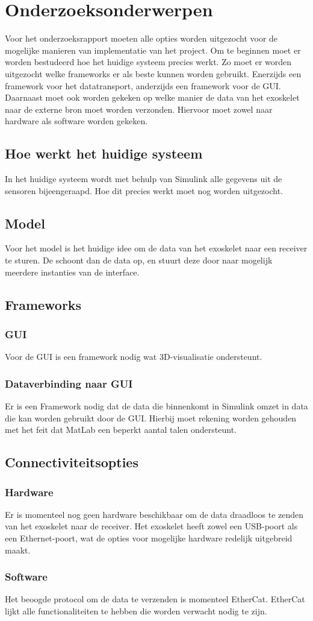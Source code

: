 \section{Onderzoeksonderwerpen}
Voor het onderzoeksrapport moeten alle opties worden uitgezocht voor de mogelijke manieren van implementatie van het project. Om	 te beginnen moet er worden bestudeerd hoe het huidige systeem precies werkt. Zo moet er worden uitgezocht welke frameworks er als beste kunnen worden gebruikt. Enerzijds een framework voor het datatransport, anderzijds een framework voor de GUI. Daarnaast moet ook worden gekeken op welke manier de data van het exoskelet naar de externe bron moet worden verzonden. Hiervoor moet zowel naar hardware als software worden gekeken.
\subsection{Hoe werkt het huidige systeem}
In het huidige systeem wordt met behulp van Simulink alle gegevens uit de sensoren bijeengeraapd. Hoe dit precies werkt moet nog worden uitgezocht. 
\subsection{Model}
Voor het model is het huidige idee om de data van het exoskelet naar een receiver te sturen. De schoont dan de data op, en stuurt deze door naar mogelijk meerdere instanties van de interface.
\subsection{Frameworks}
\subsubsection{GUI}
Voor de GUI is een framework nodig wat 3D-visualisatie ondersteunt.
\subsubsection{Dataverbinding naar GUI}
Er is een Framework nodig dat de data die binnenkomt in Simulink omzet in data die kan worden gebruikt door de GUI. Hierbij moet rekening worden gehouden met het feit dat MatLab een beperkt aantal talen ondersteunt.
\subsection{Connectiviteitsopties}
\subsubsection{Hardware}
Er is momenteel nog geen hardware beschikbaar om de data draadloos te zenden van het exoskelet naar de receiver. Het exoskelet heeft zowel een USB-poort als een Ethernet-poort, wat de opties voor mogelijke hardware redelijk uitgebreid maakt.
\subsubsection{Software}
Het beoogde protocol om de data te verzenden is momenteel EtherCat. EtherCat lijkt alle functionaliteiten te hebben die worden verwacht nodig te zijn. 